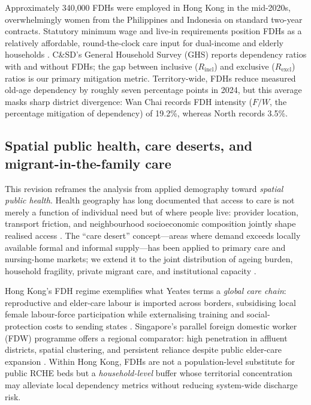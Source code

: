 \documentclass[11pt,a4paper]{article}
\begin{document}
Approximately 340{,}000 FDHs were employed in Hong Kong in the mid-2020s, overwhelmingly women from the Philippines and Indonesia on standard two-year contracts. Statutory minimum wage and live-in requirements position FDHs as a relatively affordable, round-the-clock care input for dual-income and elderly households \citep{constable2007}. C\&SD's General Household Survey (GHS) reports dependency ratios with and without FDHs; the gap between inclusive ($R_{\mathrm{incl}}$) and exclusive ($R_{\mathrm{excl}}$) ratios is our primary mitigation metric. Territory-wide, FDHs reduce measured old-age dependency by roughly seven percentage points in 2024, but this average masks sharp district divergence: Wan Chai records FDH intensity ($F/W$, the percentage mitigation of dependency) of 19.2\%, whereas North records 3.5\%.

\subsection{Spatial public health, care deserts, and migrant-in-the-family care}

This revision reframes the analysis from applied demography toward \emph{spatial public health}. Health geography has long documented that access to care is not merely a function of individual need but of where people live: provider location, transport friction, and neighbourhood socioeconomic composition jointly shape realised access \citep{martin2002,cummins2007}. The ``care desert'' concept---areas where demand exceeds locally available formal and informal supply---has been applied to primary care and nursing-home markets; we extend it to the joint distribution of ageing burden, household fragility, private migrant care, and institutional capacity \citep{padilla2019}.

Hong Kong's FDH regime exemplifies what Yeates \citep{yeates2009} terms a \emph{global care chain}: reproductive and elder-care labour is imported across borders, subsidising local female labour-force participation while externalising training and social-protection costs to sending states \citep{graham1991}. Singapore's parallel foreign domestic worker (FDW) programme offers a regional comparator: high penetration in affluent districts, spatial clustering, and persistent reliance despite public elder-care expansion \citep{yeoh1999}. Within Hong Kong, FDHs are not a population-level substitute for public RCHE beds but a \emph{household-level} buffer whose territorial concentration may alleviate local dependency metrics without reducing system-wide discharge risk.
\end{document}
